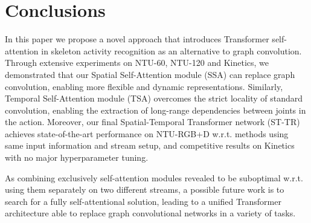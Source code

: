 \documentclass[review]{cvpr}
\begin{document}
\section{Conclusions}
In this paper we propose a novel approach that introduces Transformer self-attention in skeleton activity recognition as an alternative to graph convolution. Through extensive experiments on NTU-60, NTU-120 and Kinetics, we demonstrated that our Spatial Self-Attention module (SSA) can replace graph convolution, enabling more flexible and dynamic representations. Similarly, Temporal Self-Attention module (TSA) overcomes the strict locality of standard convolution, enabling the extraction of long-range dependencies between joints in the action. Moreover, our final Spatial-Temporal Transformer network (ST-TR) achieves state-of-the-art performance on NTU-RGB+D w.r.t. methods using same input information and stream setup, and competitive results on Kinetics with no major hyperparameter tuning.

As combining exclusively self-attention modules revealed to be suboptimal w.r.t. using them separately on two different streams, a possible future work is to search for a fully self-attentional solution, leading to a unified Transformer architecture able to replace graph convolutional networks in a variety of tasks. 







{\small


}
\end{document}
